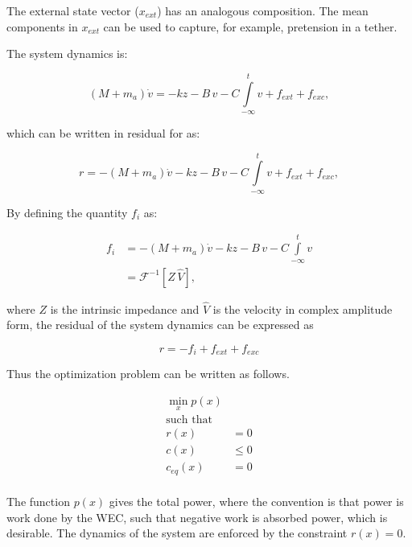 \documentclass[]{article}
\begin{document}
\noindent{}The external state vector ($x_{ext}$) has an analogous composition.
The mean components in $x_{ext}$ can be used to capture, for example, pretension in a tether.

The system dynamics is:

\begin{equation}
	(M + m_a) \dot{v} = - k z - B \, v - C \int\limits_{-\infty}^t v  + f_{ext} + f_{exc},
\end{equation}

\noindent{}which can be written in residual for as:

\begin{equation}
	r = -(M + m_a) \dot{v} - k z - B \, v - C \int\limits_{-\infty}^t v  + f_{ext} + f_{exc},
\end{equation}

By defining the quantity $f_i$ as:

\begin{subequations}
	\begin{align}
		f_i &= -(M + m_a) \dot{v} - k z - B \, v - C \int\limits_{-\infty}^t v \\
			&= \mathcal{F}^{-1} \left[ Z \, \hat{V}  \right] ,
	\end{align}
\end{subequations}

\noindent{}where $Z$ is the intrinsic impedance and $\hat{V}$ is the velocity in complex amplitude form, the residual of the system dynamics can be expressed as

\begin{equation}
	r = - f_i + f_{ext} + f_{exc}
\end{equation}

Thus the optimization problem can be written as follows.

\begin{equation}\label{eq:optimization_problem}
	\begin{aligned}
	\min_x p(x)&\\
	\textrm{such that }&\\
	r(x)&=0\\
	c(x)& \leq 0\\
	c_{eq}(x)&=0\\
	\end{aligned}
\end{equation}

\noindent{}The function $p(x)$ gives the total power, where the convention is that power is work done by the WEC, such that negative work is absorbed power, which is desirable.
The dynamics of the system are enforced by the constraint $r(x)=0$.
\end{document}
